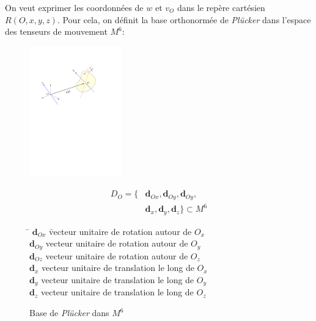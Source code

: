 \documentclass{report}
\begin{document}
On veut exprimer les coordonnées de $w$ et $v_{O}$ dans le repère cartésien $R(O,x,y,z)$. Pour cela, on définit la base orthonormée de \emph{Plücker} dans l'espace des tenseurs de mouvement $M^{6}$:\\

\begin{figure}[H]
\begin{minipage}{.3\textwidth}
  \begin{center}
  \includegraphics[width=4cm, page=3]{figs/figures}
  \end{center}
\end{minipage}
\begin{minipage}{.3\textwidth} \hfill
  \begin{align*}
  D_{O} = \lbrace &\textbf{d}_{Ox}, \textbf{d}_{Oy}, \textbf{d}_{Oy}, \\
  &\textbf{d}_{x}, \textbf{d}_{y}, \textbf{d}_{z} \rbrace \subset M^{6}
  \end{align*}
\end{minipage}
\begin{minipage}{.4\textwidth} \hfill
  \begin{tabbing}
  \= $\textbf{d}_{Ox}$ \= vecteur unitaire de rotation autour de $O_{x}$\\
  \> $\textbf{d}_{Oy}$ \> vecteur unitaire de rotation autour de $O_{y}$\\
  \> $\textbf{d}_{Oz}$ \> vecteur unitaire de rotation autour de $O_{z}$\\
  \> $\textbf{d}_{x}$  \> vecteur unitaire de translation le long de $O_{x}$\\
  \> $\textbf{d}_{y}$  \> vecteur unitaire de translation le long de $O_{y}$\\
  \> $\textbf{d}_{z}$  \> vecteur unitaire de translation le long de $O_{z}$\\
  \end{tabbing}
\end{minipage}
\caption{Base de \emph{Plücker} dans $M^{6}$}
\label{basePlucker}
\end{figure}
\end{document}
